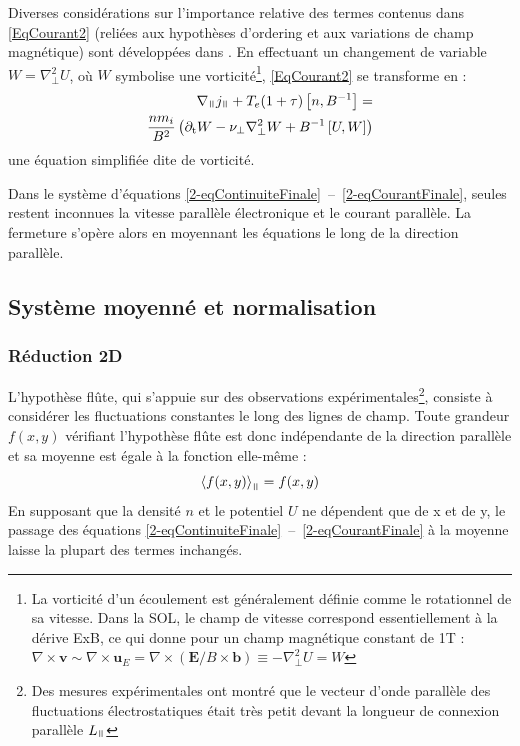\begin{refsection}
Diverses considérations sur l'importance relative des termes contenus dans
\eqref{EqCourant2} (reliées aux hypothèses d'ordering
et aux variations de champ magnétique) sont développées dans
\cite{SarazinPhD}. En effectuant un changement de variable $W=\nabla_\perp^2U$, où $W$ symbolise
une vorticité\footnote{La vorticité d'un écoulement est généralement définie comme le rotationnel de sa vitesse. Dans la SOL, le champ de vitesse correspond essentiellement à la dérive ExB, ce qui donne pour un
champ magnétique constant de 1T : 
$\nabla\times\mathbf{v}\sim\nabla\times\mathbf{u}_E=\nabla\times(\mathbf{E}/B\times\mathbf{b})\equiv-\nabla_\perp^2
U=W$ }, \eqref{EqCourant2} se transforme en :
\begin{equation}\begin{split}
\label{2-eqCourantFinale}
\nabla_\para{j}_\para +
T_e(1+\tau)\left[n,B\puissance{-1}\right] =\\
\frac{nm_i}{B^2}\left(\partial_\text{t}W - \nu_\perp
\nabla_\perp^2W+
B\puissance{-1}\left[U,W\right]\right)
\end{split}
\end{equation}
une équation simplifiée dite de vorticité. 

 Dans le système d'équations
 \eqref{2-eqContinuiteFinale}~--~\eqref{2-eqCourantFinale}, seules restent
 inconnues la vitesse parallèle électronique  et le courant parallèle. La
 fermeture s'opère alors en moyennant les équations le long de la direction
 parallèle. 

\subsection{Système moyenné et normalisation}
\label{2-flute}
\subsubsection{Réduction 2D}

 L'hypothèse flûte, qui s'appuie sur des observations
expérimentales\footnote{Des mesures expérimentales ont montré que le vecteur
d'onde parallèle des fluctuations électrostatiques était très petit devant la
longueur de connexion parallèle $L_\para$\parencite{Woot90}}, consiste à
considérer les fluctuations constantes le long des lignes de champ. Toute grandeur $f(x,y)$
vérifiant l'hypothèse flûte est donc indépendante de la direction parallèle et
sa moyenne est égale à la fonction elle-même :
\begin{equation}
\left<f(x,y)\right>_\para=f(x,y)
\end{equation}
En supposant que la densité $n$ et le potentiel $U$ ne dépendent que de x et de
y, le passage des équations
\eqref{2-eqContinuiteFinale}~--~\eqref{2-eqCourantFinale} à la moyenne laisse
la plupart des termes inchangés.


\end{refsection}
